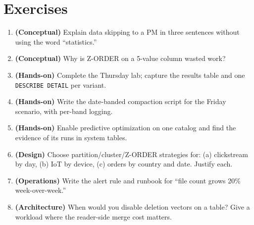 \section{Exercises}
\begin{enumerate}
    \item \textbf{(Conceptual)} Explain data skipping to a PM in three sentences without using the word ``statistics.''
    \item \textbf{(Conceptual)} Why is Z-ORDER on a 5-value column wasted work?
    \item \textbf{(Hands-on)} Complete the Thursday lab; capture the results table and one \texttt{DESCRIBE DETAIL} per variant.
    \item \textbf{(Hands-on)} Write the date-banded compaction script for the Friday scenario, with per-band logging.
    \item \textbf{(Hands-on)} Enable predictive optimization on one catalog and find the evidence of its runs in system tables.
    \item \textbf{(Design)} Choose partition/cluster/Z-ORDER strategies for: (a) clickstream by day, (b) IoT by device, (c) orders by country and date. Justify each.
    \item \textbf{(Operations)} Write the alert rule and runbook for ``file count grows 20\% week-over-week.''
    \item \textbf{(Architecture)} When would you disable deletion vectors on a table? Give a workload where the reader-side merge cost matters.
\end{enumerate}
